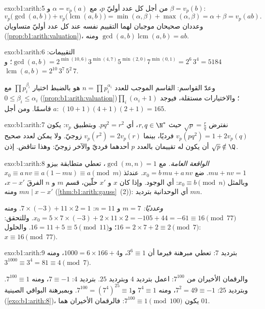 \begin{solution}{exo:b1:arith:5}
من أجل كل عدد أوليّ $p$، مع $\alpha = v_p(a)$ و $\beta = v_p(b)$:
\[
v_p\bigl(\gcd(a,b)\bigr) + v_p\bigl(\operatorname{lcm}(a,b)\bigr)
= \min(\alpha, \beta) + \max(\alpha, \beta)
= \alpha + \beta = v_p(ab) .
\]
وعددان صحيحان موجبان لهما التقييم نفسه عند كل عدد أوليّ متساويان
(\cref{prop:b1:arith:valuation})، ومنه $\gcd(a,b)\operatorname{lcm}(a,b)
= ab$.
\end{solution}

\begin{solution}{exo:b1:arith:6}
التقييمات: $\gcd(a, b) = 2^{\min(10,6)} 3^{\min(4,7)} 5^{\min(2,0)}
7^{\min(0,1)} = 2^6\, 3^4 = 5184$؛
و$\operatorname{lcm}(a,b) = 2^{10}\, 3^7\, 5^2\, 7$.

وعدّ القواسم: القاسم الموجب للعدد $n = \prod p_i^{\alpha_i}$ هو
بالضبط اختيار $\prod p_i^{\beta_i}$ مع $0 \leq \beta_i \leq
\alpha_i$ (\cref{prop:b1:arith:valuation})؛ والاختيارات
مستقلة، فيوجد $\prod_i (\alpha_i + 1)$ قاسمًا. ومن أجل $a$:
$(10+1)(4+1)(2+1) = 165$.
\end{solution}

\begin{solution}{exo:b1:arith:7}
نفترض $\sqrt p = \frac rq$ حيث $r, q \in \N^*$، أي $p q^2 =
r^2$. وبتطبيق $v_p$: يكون $v_p(pq^2) = 1 + 2v_p(q)$ فرديًا، بينما $v_p(r^2)
= 2 v_p(r)$ زوجيّ. ولا يمكن لعدد صحيح أن يكون له تقييمان بالعدد
$p$ أحدهما فرديّ والآخر زوجيّ: وهذا تناقض. إذن $\sqrt p \notin \Q$.
\end{solution}

\begin{solution}{exo:b1:arith:8}
\emph{الواقعة العامة.} مع $\gcd(m,n) = 1$، تعطي متطابقة بيزو $mu + nv = 1$.
ضع $x_0 = b\,mu + a\,nv$. عندئذ $x_0 \equiv a\,nv \equiv a(1 - mu)
\equiv a \pmod m$ وبالمثل $x_0 \equiv b \pmod n$: أي الوجود. وإذا كان
$x$ و $x'$ حلّين، قسم $m$ و $n$ الفرقَ $x - x'$، ومنه
$mn \mid x - x'$ (\cref{thm:b1:arith:gauss}~(2)): أي الوحدانية بترديد
$mn$.

\emph{وعدديًا:} $m = 7$ و $n = 11$: $7 \times (-3) + 11 \times 2 =
1$. ومنه $x_0 = 5 \times 7 \times (-3) + 2 \times 11 \times 2 = -105 +
44 = -61 \equiv 16 \pmod{77}$. وللتحقق: $16 = 2\times 7 + 2 \equiv 2
\pmod 7$؛ و$16 = 11 + 5 \equiv 5 \pmod{11}$. والحلول: $x \equiv 16
\pmod{77}$.
\end{solution}

\begin{solution}{exo:b1:arith:9}
بترديد $7$: تعطي مبرهنة فيرما أن $3^6 \equiv 1$، و$1000 = 6 \times 166 + 4$،
ومنه $3^{1000} \equiv 3^4 = 81 \equiv 4 \pmod 7$.

والرقمان الأخيران من $7^{100}$: اعمل بترديد $4$ وبترديد $25$. بترديد $4$: $7
\equiv -1$، ومنه $7^{100} \equiv 1$. وبترديد $25$: $7^2 = 49 \equiv -1$، ومنه
$7^4 \equiv 1$ و$7^{100} = (7^4)^{25} \equiv 1$. وبمبرهنة البواقي
الصينية (\cref{exo:b1:arith:8})، يكون $7^{100} \equiv 1
\pmod{100}$: فالرقمان الأخيران هما $01$.
\end{solution}

